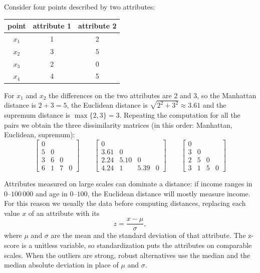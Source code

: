 \begin{example}
Consider four points described by two attributes:
\begin{center}
\begin{tabular}{ccc}
    \toprule
    point & attribute 1 & attribute 2 \\
    \midrule
    $x_1$ & 1 & 2 \\
    $x_2$ & 3 & 5 \\
    $x_3$ & 2 & 0 \\
    $x_4$ & 4 & 5 \\
    \bottomrule
\end{tabular}
\end{center}
For $x_1$ and $x_2$ the differences on the two attributes are $2$ and $3$, so the Manhattan distance is $2+3=5$, the Euclidean distance is $\sqrt{2^2+3^2}\approx 3.61$ and the supremum distance is $\max\{2,3\}=3$. Repeating the computation for all the pairs we obtain the three dissimilarity matrices (in this order: Manhattan, Euclidean, supremum):
\[
    \begin{bmatrix}
        0 &   &   &   \\
        5 & 0 &   &   \\
        3 & 6 & 0 &   \\
        6 & 1 & 7 & 0
    \end{bmatrix}
    \qquad
    \begin{bmatrix}
        0    &      &      &   \\
        3.61 & 0    &      &   \\
        2.24 & 5.10 & 0    &   \\
        4.24 & 1    & 5.39 & 0
    \end{bmatrix}
    \qquad
    \begin{bmatrix}
        0 &   &   &   \\
        3 & 0 &   &   \\
        2 & 5 & 0 &   \\
        3 & 1 & 5 & 0
    \end{bmatrix}
\]
\end{example}

Attributes measured on large scales can dominate a distance: if income ranges in $0$--$100\,000$ and age in $0$--$100$, the Euclidean distance will mostly measure income. For this reason we usually  the data before computing distances, replacing each value $x$ of an attribute with its 
\[
    z=\frac{x-\mu}{\sigma},
\]
where $\mu$ and $\sigma$ are the mean and the standard deviation of that attribute. The z-score is a unitless variable, so standardization puts the attributes on comparable scales. When the outliers are strong, robust alternatives use the median and the median absolute deviation in place of $\mu$ and $\sigma$.

